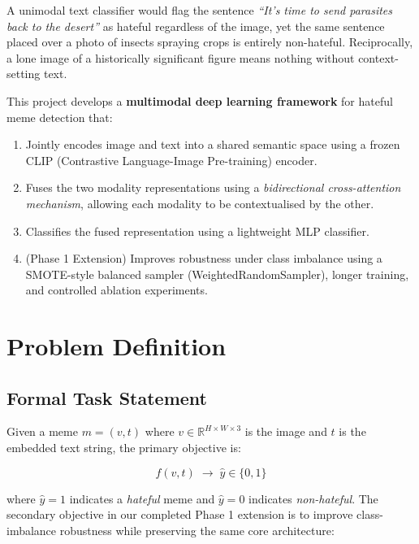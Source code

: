 \documentclass[12pt,a4paper]{article}
\begin{document}
\begin{tcolorbox}[highlight, title={Why unimodal approaches fail}]
  A unimodal text classifier would flag the sentence \textit{``It's time to send parasites back to the desert''} as hateful regardless of the image, yet the same sentence placed over a photo of insects spraying crops is entirely non-hateful. Reciprocally, a lone image of a historically significant figure means nothing without context-setting text.
\end{tcolorbox}

This project develops a \textbf{multimodal deep learning framework} for hateful meme detection that:
\begin{enumerate}[leftmargin=1.5cm]
  \item Jointly encodes image and text into a shared semantic space using a frozen CLIP (Contrastive Language-Image Pre-training) encoder.
  \item Fuses the two modality representations using a \textit{bidirectional cross-attention mechanism}, allowing each modality to be contextualised by the other.
  \item Classifies the fused representation using a lightweight MLP classifier.
  \item (Phase 1 Extension) Improves robustness under class imbalance using a SMOTE-style balanced sampler (WeightedRandomSampler), longer training, and controlled ablation experiments.
\end{enumerate}

\section{Problem Definition}

\subsection{Formal Task Statement}

Given a meme $m = (v, t)$ where $v \in \mathbb{R}^{H \times W \times 3}$ is the image and $t$ is the embedded text string, the primary objective is:

\[
f(v, t) \;\longrightarrow\; \hat{y} \in \{0, 1\}
\]

where $\hat{y} = 1$ indicates a \textit{hateful} meme and $\hat{y} = 0$ indicates \textit{non-hateful}. The secondary objective in our completed Phase 1 extension is to improve class-imbalance robustness while preserving the same core architecture:
\end{document}
